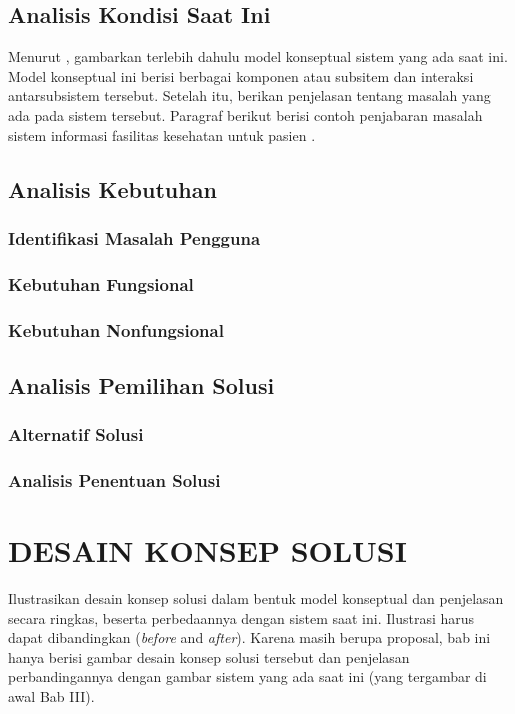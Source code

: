 \documentclass[12pt,a4paper,oneside]{book}
\begin{document}
\section{Analisis Kondisi Saat Ini}
Menurut \textcite{laudon2020}, gambarkan terlebih dahulu model konseptual sistem yang ada saat ini. Model konseptual ini berisi berbagai komponen atau subsitem dan interaksi antarsubsistem tersebut. Setelah itu, berikan penjelasan tentang masalah yang ada pada sistem tersebut. Paragraf berikut berisi contoh penjabaran masalah sistem informasi fasilitas kesehatan untuk pasien \autocite{pressman2019}. 
\section{Analisis Kebutuhan}
\lipsum[4]
\subsection{Identifikasi Masalah Pengguna}
\lipsum[5]
\subsection{Kebutuhan Fungsional}
\lipsum[6]
\subsection{Kebutuhan Nonfungsional}
\lipsum[7]

\section{Analisis Pemilihan Solusi}
\subsection{Alternatif Solusi}
\lipsum[8]
\subsection{Analisis Penentuan Solusi}
\lipsum[9]

\chapter{DESAIN KONSEP SOLUSI}
Ilustrasikan desain konsep solusi dalam bentuk model konseptual dan penjelasan secara ringkas, 
beserta perbedaannya dengan sistem saat ini. Ilustrasi harus dapat dibandingkan (\textit{before} and \textit{after}). 
Karena masih berupa proposal, bab ini hanya berisi gambar desain konsep solusi tersebut dan 
penjelasan perbandingannya dengan gambar sistem yang ada saat ini (yang tergambar di awal Bab III).
\end{document}
